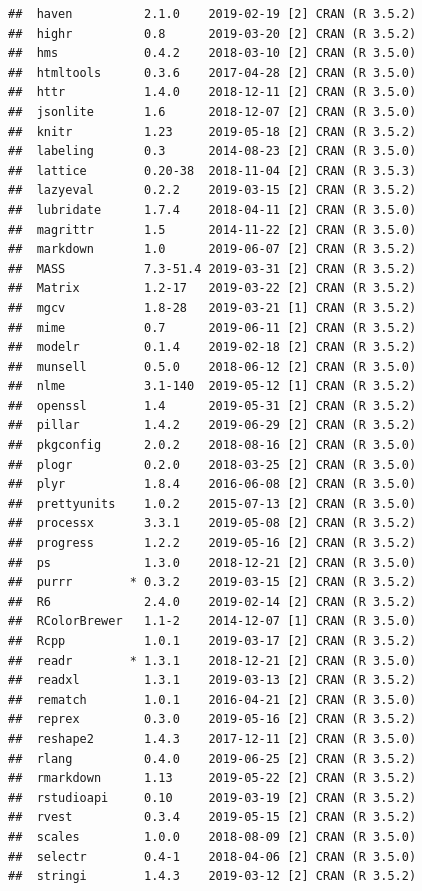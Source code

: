 \documentclass[]{book}
\begin{document}
\begin{verbatim}
##  haven          2.1.0    2019-02-19 [2] CRAN (R 3.5.2)
##  highr          0.8      2019-03-20 [2] CRAN (R 3.5.2)
##  hms            0.4.2    2018-03-10 [2] CRAN (R 3.5.0)
##  htmltools      0.3.6    2017-04-28 [2] CRAN (R 3.5.0)
##  httr           1.4.0    2018-12-11 [2] CRAN (R 3.5.0)
##  jsonlite       1.6      2018-12-07 [2] CRAN (R 3.5.0)
##  knitr          1.23     2019-05-18 [2] CRAN (R 3.5.2)
##  labeling       0.3      2014-08-23 [2] CRAN (R 3.5.0)
##  lattice        0.20-38  2018-11-04 [2] CRAN (R 3.5.3)
##  lazyeval       0.2.2    2019-03-15 [2] CRAN (R 3.5.2)
##  lubridate      1.7.4    2018-04-11 [2] CRAN (R 3.5.0)
##  magrittr       1.5      2014-11-22 [2] CRAN (R 3.5.0)
##  markdown       1.0      2019-06-07 [2] CRAN (R 3.5.2)
##  MASS           7.3-51.4 2019-03-31 [2] CRAN (R 3.5.2)
##  Matrix         1.2-17   2019-03-22 [2] CRAN (R 3.5.2)
##  mgcv           1.8-28   2019-03-21 [1] CRAN (R 3.5.2)
##  mime           0.7      2019-06-11 [2] CRAN (R 3.5.2)
##  modelr         0.1.4    2019-02-18 [2] CRAN (R 3.5.2)
##  munsell        0.5.0    2018-06-12 [2] CRAN (R 3.5.0)
##  nlme           3.1-140  2019-05-12 [1] CRAN (R 3.5.2)
##  openssl        1.4      2019-05-31 [2] CRAN (R 3.5.2)
##  pillar         1.4.2    2019-06-29 [2] CRAN (R 3.5.2)
##  pkgconfig      2.0.2    2018-08-16 [2] CRAN (R 3.5.0)
##  plogr          0.2.0    2018-03-25 [2] CRAN (R 3.5.0)
##  plyr           1.8.4    2016-06-08 [2] CRAN (R 3.5.0)
##  prettyunits    1.0.2    2015-07-13 [2] CRAN (R 3.5.0)
##  processx       3.3.1    2019-05-08 [2] CRAN (R 3.5.2)
##  progress       1.2.2    2019-05-16 [2] CRAN (R 3.5.2)
##  ps             1.3.0    2018-12-21 [2] CRAN (R 3.5.0)
##  purrr        * 0.3.2    2019-03-15 [2] CRAN (R 3.5.2)
##  R6             2.4.0    2019-02-14 [2] CRAN (R 3.5.2)
##  RColorBrewer   1.1-2    2014-12-07 [1] CRAN (R 3.5.0)
##  Rcpp           1.0.1    2019-03-17 [2] CRAN (R 3.5.2)
##  readr        * 1.3.1    2018-12-21 [2] CRAN (R 3.5.0)
##  readxl         1.3.1    2019-03-13 [2] CRAN (R 3.5.2)
##  rematch        1.0.1    2016-04-21 [2] CRAN (R 3.5.0)
##  reprex         0.3.0    2019-05-16 [2] CRAN (R 3.5.2)
##  reshape2       1.4.3    2017-12-11 [2] CRAN (R 3.5.0)
##  rlang          0.4.0    2019-06-25 [2] CRAN (R 3.5.2)
##  rmarkdown      1.13     2019-05-22 [2] CRAN (R 3.5.2)
##  rstudioapi     0.10     2019-03-19 [2] CRAN (R 3.5.2)
##  rvest          0.3.4    2019-05-15 [2] CRAN (R 3.5.2)
##  scales         1.0.0    2018-08-09 [2] CRAN (R 3.5.0)
##  selectr        0.4-1    2018-04-06 [2] CRAN (R 3.5.0)
##  stringi        1.4.3    2019-03-12 [2] CRAN (R 3.5.2)

\end{verbatim}
\end{document}
